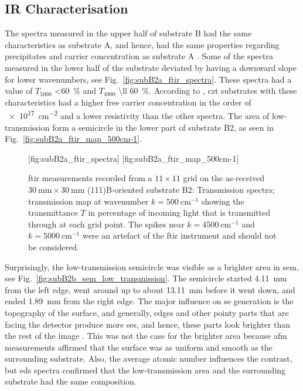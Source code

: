 \subsection{IR Characterisation}

The spectra measured in the upper half of substrate B had the same characteristics as substrate A, and hence, had the same properties regarding precipitates and carrier concentration as substrate A \citep{yujie2004infrared}. Some of the spectra measured in the lower half of the substrate deviated by having a downward slope for lower wavenumbers, see Fig.~\ref{fig:subB2a_ftir_spectra}. These spectra had a value of $T_{5000}$ \SI{<60}{\percent} and $T_{1000}$ \SI{\ll 60}{\percent}. According to \citet{yujie2004infrared}, \ac{czt} substrates with these characteristics had a higher free carrier concentration in the order of  \SI{e17}{\centi\metre^{-2}} and a lower resistivity than the other spectra. The area of low-transmission form a semicircle in the lower part of substrate B2, as seen in Fig.~\ref{fig:subB2a_ftir_map_500cm-1}. %

\begin{figure}[htbp]
    \centering
    [fig:subB2a_ftir_spectra]
    \hfill
    [fig:subB2a_ftir_map_500cm-1]
    \caption[\Ac{ftir} measurements of the as-received substrate B2.]{\Ac{ftir} measurements recorded from a $11\times11$ grid on the as-received $\SI{30}{\milli\metre}\times\SI{30}{\milli\metre}$ (111)B-oriented substrate B2:  Transmission spectra;  transmission map at wavenumber $k=\SI{500}{\centi\metre^{-1}}$ showing the transmittance $T$ in percentage of incoming light that is transmitted through at each grid point. The spikes near $k=\SI{4500}{\centi\metre^{-1}}$ and $k=\SI{5000}{\centi\metre^{-1}}$ were an artefact of the \ac{ftir} instrument and should not be considered.}
\end{figure}

Surprisingly, the low-transmission semicircle was visible as a brighter area in \ac{sem}, see Fig.~\ref{fig:subB2b_sem_low_transmission}. The semicircle started \SI{4.11}{\milli\metre} from the left edge, went around up to about \SI{13.11}{\milli\metre} before it went down, and ended \SI{1.89}{\milli\metre} from the right edge. The major influence on \ac{se} generation is the topography of the surface, and generally, edges and other pointy parts that are facing the detector produce more \acp{se}, and hence, these parts look brighter than the rest of the image \citep{goldstein2012scanning}. This was not the case for the brighter area because \ac{afm} measurements affirmed that the surface was as uniform and smooth as the surrounding substrate. Also, the average atomic number influences the contrast, but \ac{eds} spectra confirmed that the low-transmission area and the surrounding substrate had the same composition.

